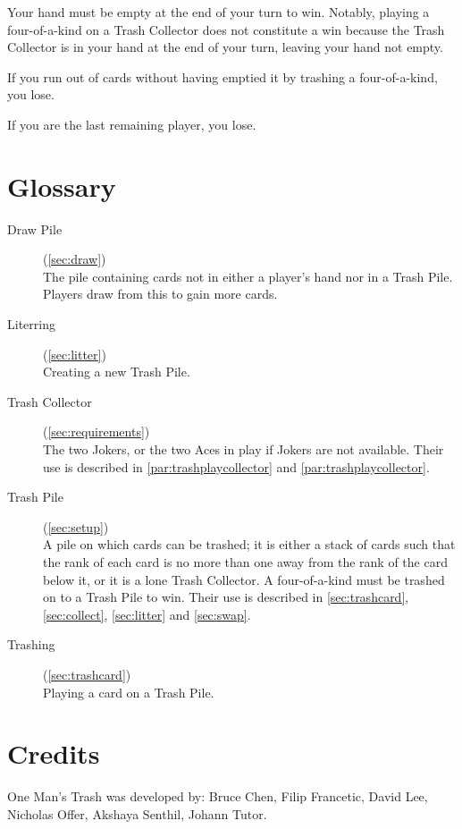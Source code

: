 \documentclass{article}
\newcommand\thegame{One Man's Trash}
\begin{document}
Your hand must be empty at the end of your turn to win. Notably, playing a four-of-a-kind on a Trash Collector does not constitute a win because the Trash Collector is in your hand at the end of your turn, leaving your hand not empty.

If you run out of cards without having emptied it by trashing a four-of-a-kind, you lose.

If you are the last remaining player, you lose.

\newpage
\appendix
\section{Glossary \label{sec:glossary}}

\begin{description}
  \item[Draw Pile] (\autoref{sec:draw})\\
    The pile containing cards not in either a player's hand nor in a Trash Pile. Players draw from this to gain more cards.
  \item[Literring] (\autoref{sec:litter})\\
    Creating a new Trash Pile.
  \item[Trash Collector] (\autoref{sec:requirements})\\
    The two Jokers, or the two Aces in play if Jokers are not available. Their use is described in \autoref{par:trashplaycollector} and \autoref{par:trashplaycollector}.
  \item[Trash Pile] (\autoref{sec:setup})\\
    A pile on which cards can be trashed; it is either a stack of cards such that the rank of each card is no more than one away from the rank of the card below it, or it is a lone Trash Collector. A four-of-a-kind must be trashed on to a Trash Pile to win. Their use is described in \autoref{sec:trashcard}, \autoref{sec:collect}, \autoref{sec:litter} and \autoref{sec:swap}.
  \item[Trashing] (\autoref{sec:trashcard})\\
    Playing a card on a Trash Pile.
\end{description}

\newpage
\section{Credits \label{sec:credits}}

\thegame{} was developed by:
Bruce Chen,
Filip Francetic,
David Lee,
Nicholas Offer,
Akshaya Senthil,
Johann Tutor.
\end{document}
